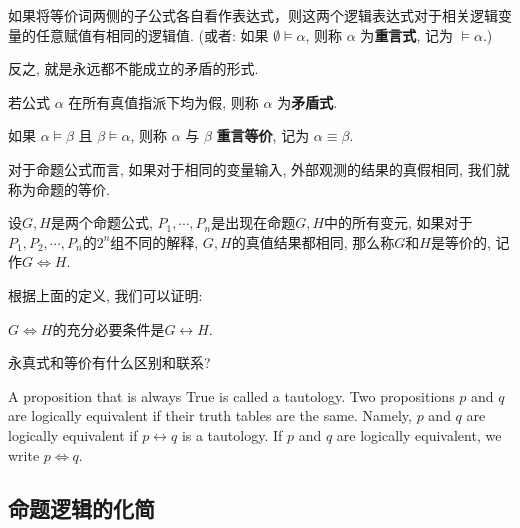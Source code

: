       \begin{definition}
        如果将等价词两侧的子公式各自看作表达式，则这两个逻辑表达式对于相关逻辑变量的任意赋值有相同的逻辑值. 
        (或者: 如果 $\emptyset \models \alpha$, 则称 $\alpha$ 为{\bf 重言式},
        记为 $\models \alpha$.)
      \end{definition}

      反之, 就是永远都不能成立的矛盾的形式. 
      
      \begin{definition}
        若公式 $\alpha$ 在所有真值指派下均为假, 则称 $\alpha$ 为{\bf 矛盾式}. 
      \end{definition}

      \begin{definition}
        如果 $\alpha \models \beta$ 且 $\beta \models \alpha$,
        则称 $\alpha$ 与 $\beta$ {\bf 重言等价}, 记为 $\alpha \equiv \beta$. 
      \end{definition}
      
     对于命题公式而言, 如果对于相同的变量输入, 外部观测的结果的真假相同, 我们就称为命题的等价. 
     
     \begin{definition}[命题的等价]
     	设$G,H$是两个命题公式, $P_1,\cdots, P_n$是出现在命题$G,H$中的所有变元, 如果对于$P_1,P_2,\cdots,P_n$的$2^n$组不同的解释, $G,H$的真值结果都相同, 那么称$G$和$H$是等价的, 记作$G\Leftrightarrow H$. 
     \end{definition}      
     根据上面的定义, 我们可以证明: 
     \begin{theorem}
     	$G\Leftrightarrow H$的充分必要条件是$G\leftrightarrow H$. 
     \end{theorem}
     
     \begin{bonus}
     	永真式和等价有什么区别和联系? 
     	
     	A proposition that is always True is called a tautology. Two propositions $p$ and $q$ are logically equivalent if their truth tables are the same. Namely, $p$ and $q$ are logically equivalent if $p \leftrightarrow q$ is a tautology. If $p$ and $q$ are logically equivalent, we write $p \Leftrightarrow q$.
     \end{bonus}
      
\subsection{命题逻辑的化简}

